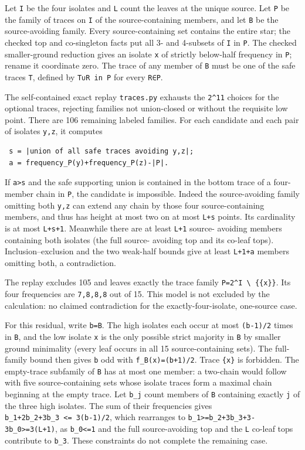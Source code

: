 \documentclass[11pt,letterpaper]{article}
\begin{document}
Let \texttt{I} be the four isolates and \texttt{L} count the leaves at
the unique source. Let \texttt{P} be the family of traces on \texttt{I}
of the source-containing members, and let \texttt{B} be the
source-avoiding family. Every source-containing set contains the entire
star; the checked top and co-singleton facts put all 3- and 4-subsets of
\texttt{I} in \texttt{P}. The checked smaller-ground reduction gives an
isolate \texttt{x} of strictly below-half frequency in \texttt{P};
rename it coordinate zero. The trace of any member of \texttt{B} must be
one of the safe traces \texttt{T}, defined by \texttt{T∪R\ in\ P} for
every \texttt{R∈P}.

The self-contained exact replay \texttt{traces.py} exhausts the
\texttt{2\^{}11} choices for the optional traces, rejecting families not
union-closed or without the requisite low point. There are 106 remaining
labeled families. For each candidate and each pair of isolates
\texttt{y,z}, it computes

\begin{verbatim}
 s = |union of all safe traces avoiding y,z|;
 a = frequency_P(y)+frequency_P(z)-|P|.
\end{verbatim}

If \texttt{a\textgreater{}s} and the safe supporting union is contained
in the bottom trace of a four-member chain in \texttt{P}, the candidate
is impossible. Indeed the source-avoiding family omitting both
\texttt{y,z} can extend any chain by those four source-containing
members, and thus has height at most two on at most \texttt{L+s} points.
Its cardinality is at most \texttt{L+s+1}. Meanwhile there are at least
\texttt{L+1} source- avoiding members containing both isolates (the full
source- avoiding top and its co-leaf tops). Inclusion--exclusion and the
two weak-half bounds give at least \texttt{L+1+a} members omitting both,
a contradiction.

The replay excludes 105 and leaves exactly the trace family
\texttt{P=2\^{}I\ \textbackslash{}\ \{\{x\}\}}. Its four frequencies are
\texttt{7,8,8,8} out of 15. This model is not excluded by the
calculation: no claimed contradiction for the exactly-four-isolate,
one-source case.

For this residual, write \texttt{b=\textbar{}B\textbar{}}. The high
isolates each occur at most \texttt{(b-1)/2} times in \texttt{B}, and
the low isolate \texttt{x} is the only possible strict majority in
\texttt{B} by smaller ground minimality (every leaf occurs in all 15
source-containing sets). The full-family bound then gives \texttt{b} odd
with \texttt{f\_B(x)=(b+1)/2}. Trace \texttt{\{x\}} is forbidden. The
empty-trace subfamily of \texttt{B} has at most one member: a two-chain
would follow with five source-containing sets whose isolate traces form
a maximal chain beginning at the empty trace. Let \texttt{b\_j} count
members of \texttt{B} containing exactly \texttt{j} of the three high
isolates. The sum of their frequencies gives
\texttt{b\_1+2b\_2+3b\_3\ \textless{}=\ 3(b-1)/2}, which rearranges to
\texttt{b\_1\textgreater{}=b\_2+3b\_3+3-3b\_0\textgreater{}=3(L+1)}, as
\texttt{b\_0\textless{}=1} and the full source-avoiding top and the
\texttt{L} co-leaf tops contribute to \texttt{b\_3}. These constraints
do not complete the remaining case.
\end{document}
